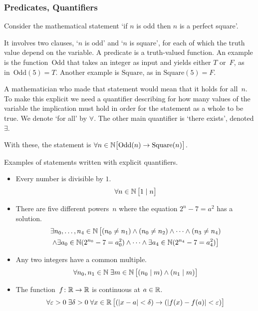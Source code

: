 \documentclass[10pt,t]{beamer}
\begin{document}
\begin{frame}
\frametitle{Predicates, Quantifiers}
Consider the mathematical
statement `if $n$ is odd then $n$ is a perfect square'.

\pause
It involves two clauses, `$n$ is odd' and `$n$ is square',
for each of which the truth value depend on the variable.
A \alert{predicate} is a truth-valued function.
An example is the function~$\text{Odd}$ that takes an integer as input and 
yields either $T$ or~$F$, as in~$\text{Odd}(5)=T$.
Another example is $\text{Square}$, as in $\text{Square}(5)=F$.

\pause
A mathematician who made that statement would mean that
it holds for all~$n$.
To make this explicit we need a
\alert{quantifier} describing for how many values of the
variable the implication must hold in order for the statement as a whole to
be true.
We denote `for all' by $\forall$.
The other main quantifier is 
`there exists', denoted $\exists$.

With these, the statement is 
$\forall n\in\mathbb{N} \big[\text{Odd}(n)\rightarrow\text{Square}(n)\big]$.
\end{frame}
\begin{frame}
Examples of statements written with explicit quantifiers.

\begin{itemize}
\item Every number is divisible by $1$.
  \begin{equation*}
    \forall n\in\mathbb{N}\,\big[1\mid n\big]
  \end{equation*}

\pause
\item There are five different powers~$n$ where the equation $2^n-7=a^2$ has a solution.
  \begin{multline*}
    \exists n_0, \ldots, n_4\in\mathbb{N}\, \big[(n_0\neq n_1) 
                                     \wedge (n_0\neq n_2) 
                                     \wedge \cdots 
                                     \wedge (n_3\neq n_4)  \\
                                     \wedge \exists a_0\in\mathbb{N}(2^{n_0}-7=a_0^2)
                                     \wedge\cdots\wedge
                                     \exists a_4\in\mathbb{N}(2^{n_4}-7=a_4^2)\big]
  \end{multline*}

\pause
\item Any two integers have a common multiple.
  \begin{equation*}
    \forall n_0,n_1\in\mathbb{N}\;\exists m\in\mathbb{N}\,
        \big[(n_0\mid m)\wedge (n_1\mid m)\big]
  \end{equation*}

\pause
\item The function~$\mbox{$f\colon \mathbb{R}\to \mathbb{R}$}$ is continuous at $a\in\mathbb{R}$.
  \begin{equation*}
    \forall \varepsilon >0\;\exists \delta > 0\;\forall x\in\mathbb{R}\,
        \big[(\lvert x-a\rvert<\delta)\rightarrow (\lvert f(x)-f(a)\rvert<\varepsilon)\big]
  \end{equation*}
\end{itemize}
\end{frame}
\end{document}
